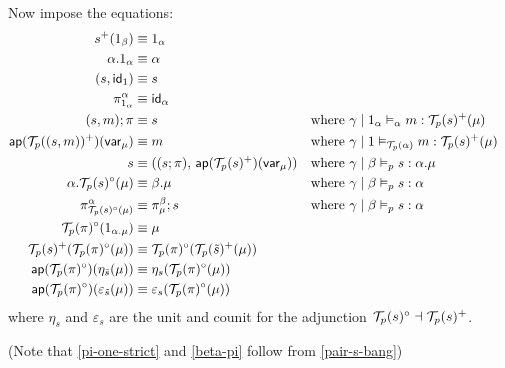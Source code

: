 \documentclass[10pt]{article}
\newcommand\TermTwoT[5]{\ensuremath{#1 \mid #3 \vDash_{#5} #2 : #4}}
\newcommand{\id}{\mathsf{id}}
\begin{document}
Now impose the equations:
\begin{align}
\label{s-plus-one-strict}
s^+(1_\beta) &\equiv 1_\alpha \\
\label{dot-one-strict}
\alpha.1_\alpha &\equiv \alpha \\
\label{pair-s-bang}
(s, \id_{1}) &\equiv s\\
\label{pi-one-strict}
\pi^\alpha_{1_\alpha} &\equiv \id_\alpha \\
\label{beta-pi}
(s, m);\pi &\equiv s && \text{where } \TermTwoT{\gamma}{m}{1_\alpha}{\El{p}{s}^+(\mu)}{\alpha}\\
\label{beta-var}
\mathsf{ap}(\El{p}{(s,m)}^+)(\mathsf{var}_\mu) &\equiv m && \text{where } \TermTwoT{\gamma}{m}{1}{\El{p}{s}^+(\mu)}{\El{p}{\alpha}} \\
\label{eta-pi-var}
s &\equiv ((s;\pi), \, \mathsf{ap}(\El{p}{s}^+)(\mathsf{var}_\mu)) && \text{where } \TermTwoT{\gamma}{s}{\beta}{\alpha.\mu}{p} \\
\label{dot-circ}
\alpha.\El{p}{s}^\circ(\mu) &\equiv \beta.\mu && \text{where } \TermTwoT{\gamma}{s}{\beta}{\alpha}{p}\\
\label{pi-dot-circ}
\pi^\alpha_{\El{p}{s}^\circ(\mu)} &\equiv \pi^\beta_\mu;s && \text{where } \TermTwoT{\gamma}{s}{\beta}{\alpha}{p}\\
\label{circ-one}
\El{p}{\pi}^\circ(1_{\alpha.\mu}) &\equiv \mu \\
\label{pi-circ-morphism-of-fibrations}
\El{p}{s}^+(\El{p}{\pi}^\circ(\mu)) &\equiv \El{p}{\pi}^\circ(\El{p}{\tilde{s}}^+(\mu)) \\
\mathsf{ap}(\El{p}{\pi}^\circ)(\eta_{\tilde{s}}(\mu))  &\equiv \eta_s(\El{p}{\pi}^\circ(\mu)) \\
\mathsf{ap}(\El{p}{\pi}^\circ)(\varepsilon_{\tilde{s}}(\mu))  &\equiv \varepsilon_s(\El{p}{\pi}^\circ(\mu))
\end{align}
where $\eta_s$ and $\varepsilon_s$ are the unit and counit for the adjunction $\mathcal{T}_{p}(s)^\circ \dashv \mathcal{T}_{p}(s)^+$.

(Note that \eqref{pi-one-strict} and \eqref{beta-pi} follow from \eqref{pair-s-bang})
\end{document}

